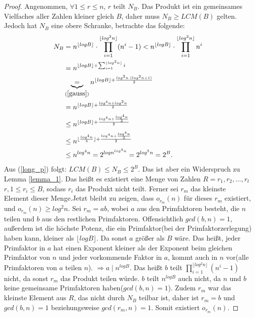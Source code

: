 \documentclass[12pt,oneside]{article}
\theoremstyle{remark}
\theoremstyle{definition}
\begin{document}
\begin{proof}
Angenommen, $\forall 1 \leq r \leq n$, $r$ teilt $N_{B}$. Das Produkt ist ein gemeinsames Vielfaches aller Zahlen kleiner gleich $B$, daher muss $N_{B} \geq LCM(B)$ gelten. Jedoch hat $N_{B}$ eine obere Schranke, betrachte das folgende:
\begin{equation}\label{long_p}
    \begin{split}
        \begin{aligned}
            N_{B} &= n^{\lfloor log B \rfloor } \cdot \prod_{i = 1}^{\lfloor log^2 n \rfloor} (n^i - 1)
                < n^{\lfloor log B \rfloor } \cdot \prod_{i = 1}^{\lfloor log^2 n \rfloor} n^i \\
                &= n^{\lfloor log B \rfloor + \sum_{i = 1}^{\lfloor log^2 n \rfloor } i}\\ 
                &\underbrace{=}_{(\ref{gauss})} n^{\lfloor log B \rfloor + \frac{log^2 n \cdot (log^2 n + 1)}{2}}  \\
                &= n^{\lfloor log B \rfloor + \frac{log^4 n + log^2 n}{2}}\\
                & \leq n^{\lfloor log B \rfloor + \frac{log^4 n + \frac{log^4 n}{2}}{2}}\\
                & \leq n^{\lfloor \frac{log^4 n}{4} \rfloor + \frac{log^4 n + \frac{log^4 n}{2}}{2}}\\
                & \leq n^{log^4 n} = 2^{log n^{log^4 n}} = 2^{log^5 n} = 2^{B}.
        \end{aligned}
    \end{split}
\end{equation}
Aus (\ref{long_p}) folgt: $LCM(B) \leq N_{B} \leq 2^B$. Das ist aber ein Widerspruch zu Lemma \ref{lemma_1}. Das heißt es existiert eine Menge von Zahlen $R = {r_{1},r_{2},...,r_{t}}$ $r, 1 \leq r_i \leq B$, sodass $r_{i}$ das Produkt nicht teilt. Ferner sei $r_{m}$ das kleinste Element dieser Menge.\newline\newline Jetzt bleibt zu zeigen, dass $o_{r_{m}}(n)$ für dieses $r_{m}$ existiert, und $o_{r_{m}}(n) \geq log^2 n$. Sei $r_{m} = ab $, wobei $a$ aus den Primfaktoren besteht, die $n$ teilen und $b$ aus den restlichen Primfaktoren. Offensichtlich $gcd(b,n) = 1$, außerdem ist die höchste Potenz, die ein Primfaktor(bei der Primfaktorzerlegung) haben kann, kleiner als $\lfloor log B \rfloor$. Da sonst $a$ größer als $B$ wäre. Das heißt, jeder Primfaktor in $a$ hat einen Exponent kleiner als der Exponent beim gleichen Primfaktor von $n$ und jeder vorkommende Faktor in $a$, kommt auch in $n$ vor(alle Primfaktoren von $a$ teilen $n$).\newline
$\Rightarrow a \mid n^{log B}$.\newline
Das heißt $b$ teilt $\prod_{i = 1}^{\lfloor log^2 n \rfloor}(n^i - 1)$ nicht, da sonst $r_{m}$ das Produkt teilen würde. $b$ teilt $n^{log B}$ auch nicht, da $n$ und $b$ keine gemeinsame Primfaktoren haben($gcd(b,n) = 1$). Zudem $r_{m}$ war das kleinste Element aus $R$, das nicht durch $N_{B}$ teilbar ist, daher ist $r_{m}= b$ und $gcd(b,n) = 1$ beziehungsweise $gcd(r_{m},n) = 1$. Somit existiert $o_{r_{m}}(n)$.\newline\newline


\end{proof}
\end{document}
